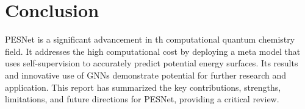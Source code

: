 \documentclass{article}
\begin{document}
\section{Conclusion}
PESNet is a significant advancement in th computational quantum chemistry field. It addresses the high computational cost by deploying a meta model that uses self-supervision to accurately predict potential energy surfaces. Its results and innovative use of GNNs demonstrate potential for further research and application. This report has summarized the key contributions, strengths, limitations, and future directions for PESNet, providing a critical review.



\end{document}
